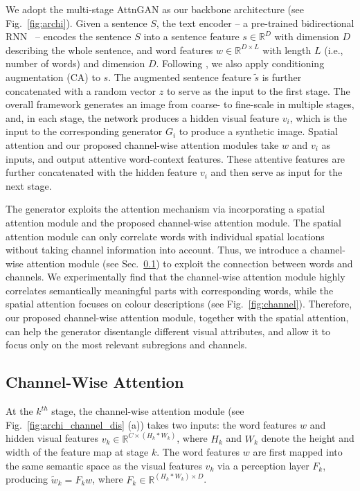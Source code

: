 We adopt the multi-stage AttnGAN \cite{xu2018attngan} as our backbone architecture (see Fig.~\ref{fig:archi}).
Given a sentence $S$, the text encoder -- a pre-trained bidirectional RNN~\cite{xu2018attngan} -- encodes the sentence $S$ into a sentence feature $s \in \mathbb{R}^{D}$ with dimension $D$ describing the whole sentence, and word features $w \in \mathbb{R}^{{D}\times L}$ with length $L$ (i.e., number of words) and dimension $D$. Following \cite{zhang2017stackgan}, we also apply conditioning augmentation (CA) to $s$. The augmented sentence feature $\tilde{s}$ is further concatenated with a random vector $z$ to serve as the input to the first stage. The overall framework generates an image from coarse- to fine-scale in multiple stages, and, in each stage, the network produces a hidden visual feature $v_i$, which is the input to the corresponding generator $G_i$ to produce a synthetic image. Spatial attention \cite{xu2018attngan} and our proposed channel-wise attention modules {take $w$ and $v_i$ as inputs}, and output attentive word-context features. These attentive features are further concatenated with the hidden feature $v_i$ and then serve as input for the next stage.

The generator exploits the attention mechanism via incorporating a spatial attention module \cite{xu2018attngan} and the proposed channel-wise attention module. The spatial attention module \cite{xu2018attngan} can only correlate words with individual spatial locations without taking channel information into account. Thus, we introduce a channel-wise attention module (see Sec.~\ref{sec:channel-attention}) {to exploit the connection between words and channels}. We experimentally find that the channel-wise attention module highly correlates semantically meaningful parts with corresponding words, while the spatial attention focuses on colour descriptions (see Fig.~\ref{fig:channel}).
{Therefore,} {our proposed channel-wise attention module, together with the spatial attention}, can help the generator disentangle different visual attributes, and allow it to focus {only} on the most relevant subregions and channels.

\subsection{Channel-Wise Attention}
\label{sec:channel-attention}
At the $k^{th}$ stage, the channel-wise attention module (see Fig.~\ref{fig:archi_channel_dis} (a)) takes two inputs: the word features $w$ and hidden visual features $v_{k} \in \mathbb{R}^{C \times (H_{k} \ast W_{k})}$, where $H_{k}$ and $W_{k}$ denote the height and width of the feature map at stage $k$. The word features $w$ are first mapped into the same semantic space as the visual features $v_{k}$ via a perception layer $F_{k}$, producing $\tilde{w}_{k}=F_{k}w$, where $F_{k} \in \mathbb{R}^{(H_{k} \ast W_{k}) \times D}$.

